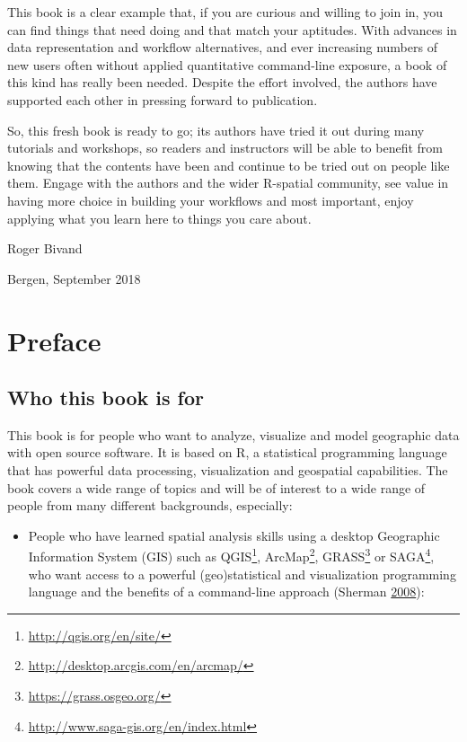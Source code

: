 \documentclass[]{krantz}
\providecommand{\tightlist}{%
  \setlength{\itemsep}{0pt}\setlength{\parskip}{0pt}}
\let\rmarkdownfootnote\footnote%
\def\footnote{\protect\rmarkdownfootnote}
\renewcommand{\href}[2]{#2\footnote{\url{#1}}}
\begin{document}
This book is a clear example that, if you are curious and willing to join in, you can find things that need doing and that match your aptitudes. With advances in data representation and workflow alternatives, and ever increasing numbers of new users often without applied quantitative command-line exposure, a book of this kind has really been needed. Despite the effort involved, the authors have supported each other in pressing forward to publication.

So, this fresh book is ready to go; its authors have tried it out during many tutorials and workshops, so readers and instructors will be able to benefit from knowing that the contents have been and continue to be tried out on people like them. Engage with the authors and the wider R-spatial community, see value in having more choice in building your workflows and most important, enjoy applying what you learn here to things you care about.

Roger Bivand

Bergen, September 2018

\hypertarget{preface}{%
\section*{Preface}\label{preface}}

\hypertarget{who-this-book-is-for}{%
\subsection*{Who this book is for}\label{who-this-book-is-for}}

This book is for people who want to analyze, visualize and model geographic data with open source software.
It is based on R, a statistical programming language that has powerful data processing, visualization and geospatial capabilities.
The book covers a wide range of topics and will be of interest to a wide range of people from many different backgrounds, especially:

\begin{itemize}
\tightlist
\item
  People who have learned spatial analysis skills using a desktop Geographic Information System (GIS) such as \href{http://qgis.org/en/site/}{QGIS}, \href{http://desktop.arcgis.com/en/arcmap/}{ArcMap}, \href{https://grass.osgeo.org/}{GRASS} or \href{http://www.saga-gis.org/en/index.html}{SAGA}, who want access to a powerful (geo)statistical and visualization programming language and the benefits of a command-line approach (Sherman \protect\hyperlink{ref-sherman_desktop_2008}{2008}):
\end{itemize}
\end{document}
